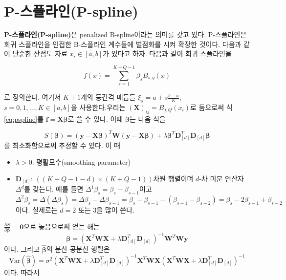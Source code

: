 \documentclass[b5paper,]{scrbook}
\theoremstyle{plain}
\theoremstyle{definition}
\numberwithin{equation}{section}
\begin{document}
\hypertarget{p-p-spline}{%
\section{P-스플라인(P-spline)}\label{p-p-spline}}

\textbf{P-스플라인(P-spline)}은 penalized B-spline이라는 의미를 갖고 있다. P-스플라인은 회귀 스플라인을 인접한 B-스플라인 계수들에 벌점화를 시켜 확장한 것이다. 다음과 같이 단순한 산점도 자료 \(x_{i}\in [a,b]\)가 있다고 하자. 다음과 같이 회귀 스플라인을

\begin{equation}
f(x)=\sum_{s=1}^{K+Q-1}\beta_{s}B_{s,q}(x)
\label{eq:pspline}
\end{equation}

로 정의한다. 여기서 \(K+1\)개의 등간격 매듭들 \(\xi_{s}=a + s\frac{b-a}{K}\), \(s=0,1,\ldots, K\in [a,b]\)을 사용한다.우리는 \((\mathbf{X})_{ij}=B_{j,Q}(x_{i})\)로 둠으로써 식 \eqref{eq:pspline}를 \(\mathbf{f}=\mathbf{X}\boldsymbol{\beta}\)로 쓸 수 있다. 이때 \(\boldsymbol{\beta}\)는 다음 식을

\[S(\boldsymbol{\beta})=(\mathbf{y}-\mathbf{X}\boldsymbol{\beta})^{T}\mathbf{W}(\mathbf{y}-\mathbf{X}\boldsymbol{\beta}) + \lambda \boldsymbol{\beta}^{T}\mathbf{D}_{[d]}^{T}\mathbf{D}_{[d]}\boldsymbol{\beta}\]
를 최소화함으로써 추정할 수 있다. 이 때

\begin{itemize}
\item
  \(\lambda > 0\): 평활모수(smoothing parameter)
\item
  \(\mathbf{D}_{[d]}\): \(((K+Q-1-d)\times (K+Q-1))\)차원 행렬이며 \(d\)-차 미분 연산자 \(\Delta^{d}\)를 갖는다. 예를 들면 \(\Delta^{1}\beta_{s}=\beta_{s}-\beta_{s-1}\)이고 \(\Delta^{2}\beta_{s}=\Delta(\Delta \beta_{s})=\Delta\beta_{s}-\Delta\beta_{s-1}=\beta_{s}-\beta_{s-1}-(\beta_{s-1}-\beta_{s-2})=\beta_{s}-2\beta_{s-1}+\beta_{s-2}\)이다. 실제로는 \(d=2\) 또는 \(3\)을 많이 쓴다.
\end{itemize}

\(\frac{\partial S}{\partial \boldsymbol{\beta}}=\mathbf{0}\)으로 놓음으로써 얻는 해는
\[\boldsymbol{\beta}=(\mathbf{X}^{T}\mathbf{W}\mathbf{X}+\lambda \mathbf{D}_{[d]}^{T}\mathbf{D}_{[d]})^{-1}\mathbf{W}^{T}\mathbf{W}\mathbf{y}\]
이다. 그리고 \(\hat{\boldsymbol{\beta}}\)의 분산-공분산 행렬은
\[\text{Var}(\hat{\boldsymbol{\beta}})=\sigma^{2}(\mathbf{X}^{T}\mathbf{W}\mathbf{X}+\lambda \mathbf{D}_{[d]}^{T}\mathbf{D}_{[d]})^{-1}\mathbf{X}^{T}\mathbf{W}\mathbf{X}(\mathbf{X}^{T}\mathbf{W}\mathbf{X}+\lambda \mathbf{D}_{[d]}^{T}\mathbf{D}_{[d]})^{-1}\]
이다. 따라서
\end{document}
